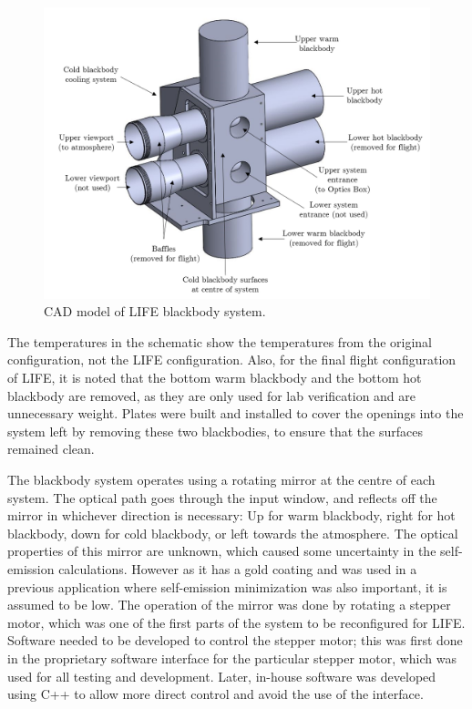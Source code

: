 \begin{figure}
    \centering
    \includegraphics[width=\linewidth]{chap3_images/Blackbody_CAD_labelled_PNG.png}
    \caption{CAD model of LIFE blackbody system.}
    \label{fig:CAD_Blackbodies}
\end{figure}

The temperatures in the schematic show the temperatures from the original configuration, not the LIFE configuration. Also, for the final flight configuration of LIFE, it is noted that the bottom warm blackbody and the bottom hot blackbody are removed, as they are only used for lab verification and are unnecessary weight. Plates were built and installed to cover the openings into the system left by removing these two blackbodies, to ensure that the surfaces remained clean.

The blackbody system operates using a rotating mirror at the centre of each system. The optical path goes through the input window, and reflects off the mirror in whichever direction is necessary: Up for warm blackbody, right for hot blackbody, down for cold blackbody, or left towards the atmosphere. The optical properties of this mirror are unknown, which caused some uncertainty in the self-emission calculations. However as it has a gold coating and was used in a previous application where self-emission minimization was also important, it is assumed to be low. The operation of the mirror was done by rotating a stepper motor, which was one of the first parts of the system to be reconfigured for LIFE. Software needed to be developed to control the stepper motor; this was first done in the proprietary software interface for the particular stepper motor, which was used for all testing and development. Later, in-house software was developed using C++ to allow more direct control and avoid the use of the interface. 

